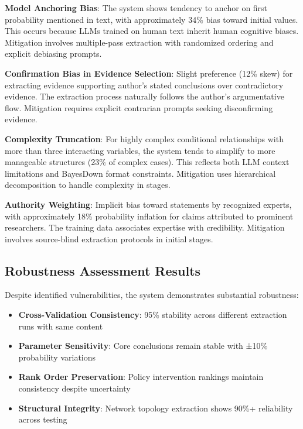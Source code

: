 \documentclass[
  11pt,
  letterpaper,
]{book}
\providecommand{\tightlist}{%
  \setlength{\itemsep}{0pt}\setlength{\parskip}{0pt}}
\begin{document}
\textbf{Model Anchoring Bias}: The system shows tendency to anchor on
first probability mentioned in text, with approximately 34\% bias toward
initial values. This occurs because LLMs trained on human text inherit
human cognitive biases. Mitigation involves multiple-pass extraction
with randomized ordering and explicit debiasing prompts.

\textbf{Confirmation Bias in Evidence Selection}: Slight preference
(12\% skew) for extracting evidence supporting author's stated
conclusions over contradictory evidence. The extraction process
naturally follows the author's argumentative flow. Mitigation requires
explicit contrarian prompts seeking disconfirming evidence.

\textbf{Complexity Truncation}: For highly complex conditional
relationships with more than three interacting variables, the system
tends to simplify to more manageable structures (23\% of complex cases).
This reflects both LLM context limitations and BayesDown format
constraints. Mitigation uses hierarchical decomposition to handle
complexity in stages.

\textbf{Authority Weighting}: Implicit bias toward statements by
recognized experts, with approximately 18\% probability inflation for
claims attributed to prominent researchers. The training data associates
expertise with credibility. Mitigation involves source-blind extraction
protocols in initial stages.

\subsection{Robustness Assessment
Results}\label{sec-robustness-assessment}

Despite identified vulnerabilities, the system demonstrates substantial
robustness:

\begin{itemize}
\tightlist
\item
  \textbf{Cross-Validation Consistency}: 95\% stability across different
  extraction runs with same content
\item
  \textbf{Parameter Sensitivity}: Core conclusions remain stable with
  ±10\% probability variations
\item
  \textbf{Rank Order Preservation}: Policy intervention rankings
  maintain consistency despite uncertainty
\item
  \textbf{Structural Integrity}: Network topology extraction shows 90\%+
  reliability across testing
\end{itemize}
\end{document}
